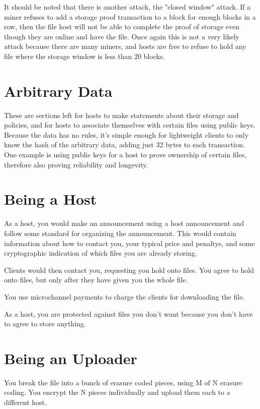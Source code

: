 \documentclass[twocolumn]{article}
\begin{document}

It should be noted that there is another attack, the "closed window" attack.
If a miner refuses to add a storage proof transaction to a block for enough blocks in a row, then the file host will not be able to complete the proof of storage even though they are online and have the file.
Once again this is not a very likely attack because there are many miners, and hosts are free to refuse to hold any file where the storage window is less than 20 blocks.

\section{Arbitrary Data}
These are sections left for hosts to make statements about their storage and policies, and for hosts to associate themselves with certain files using public keys.
Because the data has no rules, it's simple enough for lightweight clients to only know the hash of the arbitrary data, adding just 32 bytes to each transaction.
One example is using public keys for a host to prove ownership of certain files, therefore also proving reliability and longevity.

\section{Being a Host}
As a host, you would make an announcement using a host announcement and follow some standard for organizing the announcement.
This would contain information about how to contact you, your typical price and penaltys, and some cryptographic indication of which files you are already storing.

Clients would then contact you, requesting you hold onto files.
You agree to hold onto files, but only after they have given you the whole file.

You use microchannel payments to charge the clients for downloading the file.

As a host, you are protected against files you don't want because you don't have to agree to store anything.

\section{Being an Uploader}
You break the file into a bunch of erasure coded pieces, using M of N erasure coding.
You encrypt the N pieces individually and upload them each to a different host.
\end{document}
